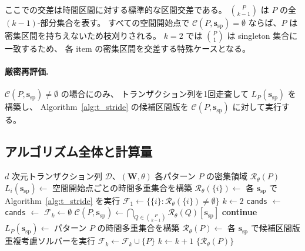 ここでの交差は時間区間に対する標準的な区間交差である。
$\binom{P}{k-1}$ は $P$ の全 $(k{-}1)$-部分集合を表す。
すべての空間開始点で $\mathcal{C}(P,\bm{s}_{\mathrm{sp}})=\emptyset$
ならば、$P$ は密集区間を持ちえないため枝刈りされる。
$k=2$ では $\binom{P}{1}$ は singleton 集合に一致するため、
各 item の密集区間を交差する特殊ケースとなる。

\paragraph{厳密再評価.}
$\mathcal{C}(P,\bm{s}_{\mathrm{sp}}) \neq \emptyset$ の場合にのみ、
トランザクション列を1回走査して $L_P(\bm{s}_{\mathrm{sp}})$ を構築し、
Algorithm~\ref{alg:t_stride} の候補区間版を
$\mathcal{C}(P,\bm{s}_{\mathrm{sp}})$ に対して実行する。

\subsection{アルゴリズム全体と計算量}\label{sec:complexity}

\begin{algorithm}[t]
\caption{多次元 Apriori-Window（区間ベース実装）}
\label{alg:md_apriori}
\begin{algorithmic}[1]
\Require $d$ 次元トランザクション列 $\mathcal{D}$、$(\bm{W}, \theta)$
\Ensure 各パターン $P$ の密集領域 $\mathcal{R}_\theta(P)$
  \State $L_i(\bm{s}_{\mathrm{sp}}) \leftarrow$ 空間開始点ごとの時間多重集合を構築
  \State $\mathcal{R}_\theta(\{i\}) \leftarrow$ 各 $\bm{s}_{\mathrm{sp}}$ で Algorithm~\ref{alg:t_stride} を実行
\EndFor
\State $\mathcal{F}_1 \leftarrow \{\{i\} : \mathcal{R}_\theta(\{i\}) \neq \emptyset\}$
\State $k \leftarrow 2$
  \State \texttt{cands} $\leftarrow$ 
  \State \texttt{cands} $\leftarrow$ 
  \State $\mathcal{F}_k \leftarrow \emptyset$
    \State $\mathcal{C}(P,\bm{s}_{\mathrm{sp}}) \leftarrow \bigcap_{Q \in \binom{P}{k-1}}\mathcal{R}_\theta(Q)[\bm{s}_{\mathrm{sp}}]$
      \State \textbf{continue}
    \EndIf
    \State $L_P(\bm{s}_{\mathrm{sp}}) \leftarrow$ パターン $P$ の時間多重集合を構築
    \State $\mathcal{R}_\theta(P) \leftarrow$ 各 $\bm{s}_{\mathrm{sp}}$ で候補区間版重複考慮ソルバーを実行
      \State $\mathcal{F}_k \leftarrow \mathcal{F}_k \cup \{P\}$
    \EndIf
  \EndFor
  \State $k \leftarrow k + 1$
\EndWhile
\State \Return $\{\mathcal{R}_\theta(P)\}$
\end{algorithmic}
\end{algorithm}

